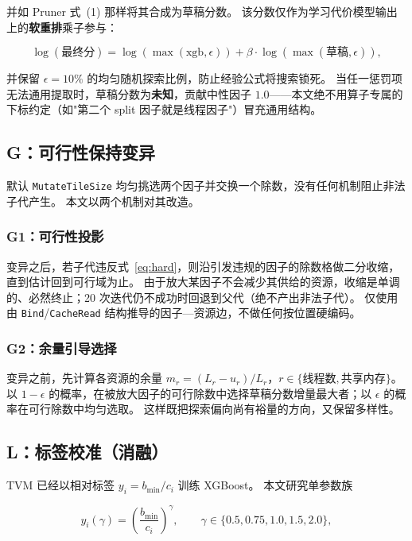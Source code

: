 \documentclass[UTF8]{ctexart}
\begin{document}
并如 Pruner 式~(1) 那样将其合成为草稿分数。
该分数仅作为学习代价模型输出上的\textbf{软重排}乘子参与：

\begin{equation}
\log(\text{最终分}) = \log(\max(\text{xgb}, \epsilon)) + \beta \cdot \log(\max(\text{草稿}, \epsilon)),
\label{eq:combine}
\end{equation}

并保留 $\epsilon=10\%$ 的均匀随机探索比例，防止经验公式将搜索锁死。
当任一惩罚项无法通用提取时，草稿分数为\textbf{未知}，贡献中性因子 $1.0$——本文绝不用算子专属的下标约定（如"第二个 split 因子就是线程因子"）冒充通用结构。

\subsection{G：可行性保持变异}

默认 \texttt{MutateTileSize} 均匀挑选两个因子并交换一个除数，没有任何机制阻止非法子代产生。
本文以两个机制对其改造。

\subsubsection{G1：可行性投影}

变异之后，若子代违反式~\eqref{eq:hard}，则沿引发违规的因子的除数格做二分收缩，直到估计回到可行域为止。
由于放大某因子不会减少其供给的资源，收缩是单调的、必然终止；20 次迭代仍不成功时回退到父代（绝不产出非法子代）。
仅使用由 \texttt{Bind}/\texttt{CacheRead} 结构推导的因子—资源边，不做任何按位置硬编码。

\subsubsection{G2：余量引导选择}

变异之前，先计算各资源的余量 $m_r = (L_r - u_r)/L_r$，$r \in \{\text{线程数}, \text{共享内存}\}$。
以 $1-\epsilon$ 的概率，在被放大因子的可行除数中选择草稿分数增量最大者；以 $\epsilon$ 的概率在可行除数中均匀选取。
这样既把探索偏向尚有裕量的方向，又保留多样性。

\subsection{L：标签校准（消融）}

TVM 已经以相对标签 $y_i = b_{\min}/c_i$ 训练 XGBoost。
本文研究单参数族

\begin{equation}
y_i(\gamma) = \left( \frac{b_{\min}}{c_i} \right)^\gamma, \qquad \gamma \in \{0.5, 0.75, 1.0, 1.5, 2.0\},
\label{eq:label}
\end{equation}
\end{document}
